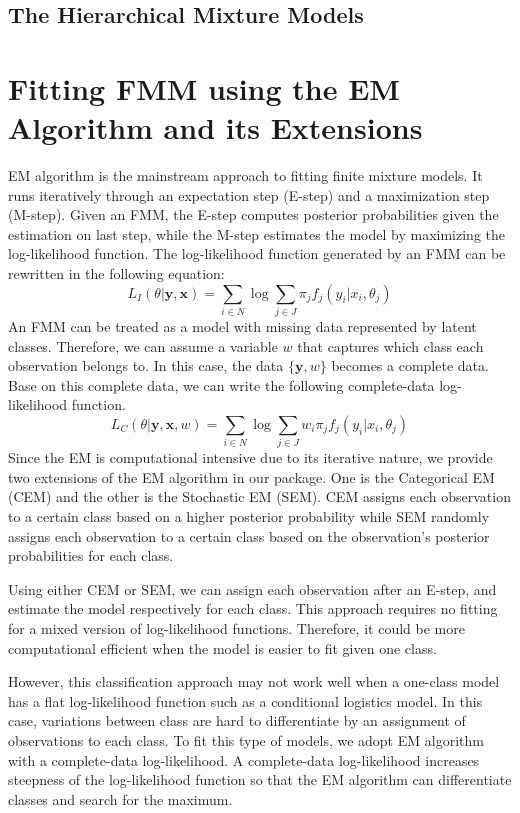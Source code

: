 \documentclass[nojss]{jss}
\begin{document}
      \subsection{The Hierarchical Mixture Models}
   \section{Fitting FMM using the EM Algorithm and its Extensions}
   EM algorithm is the mainstream approach to fitting finite mixture models. It runs iteratively through an expectation step (E-step) and a maximization step (M-step). Given an FMM, the E-step computes posterior probabilities given the estimation on last step, while the M-step estimates the model by maximizing the log-likelihood function.
   The log-likelihood function generated by an FMM can be rewritten in the following equation:
   \begin{equation}
   L_I(\theta|\mathbf{y},\mathbf{x}) = \sum_{i \in N} \log \sum_{j \in J} \pi_j f_j(y_i | x_i, \theta_j)
   \end{equation}
   An FMM can be treated as a model with missing data represented by latent classes. Therefore, we can assume a variable $w$ that captures which class each observation belongs to. In this case, the data $\{\mathbf{y}, w\}$ becomes a complete data. Base on this complete data, we can write the following complete-data log-likelihood function.
   \begin{equation}
      L_C(\theta|\mathbf{y},\mathbf{x}, w) = \sum_{i \in N} \log \sum_{j \in J} w_i \pi_j f_j(y_i| x_i, \theta_j)
   \end{equation}
   Since the EM is computational intensive due to its iterative nature, we provide two extensions of the EM algorithm in our package. One is the Categorical EM (CEM) and the other is the Stochastic EM (SEM). CEM assigns each observation to a certain class based on a higher posterior probability while SEM randomly assigns each observation to a certain class based on the observation's posterior probabilities for each class. 
   
   Using either CEM or SEM, we can assign each observation after an E-step, and estimate the model respectively for each class. This approach requires no fitting for a mixed version of log-likelihood functions. Therefore, it could be more computational efficient when the model is easier to fit given one class.
   
   However, this classification approach may not work well when a one-class model has a flat log-likelihood function such as a conditional logistics model. In this case, variations between class are hard to differentiate by an assignment of observations to each class. To fit this type of models, we adopt EM algorithm with a complete-data log-likelihood. A complete-data log-likelihood increases steepness of the log-likelihood function so that the EM algorithm can differentiate classes and search for the maximum. 
   
\end{document}
